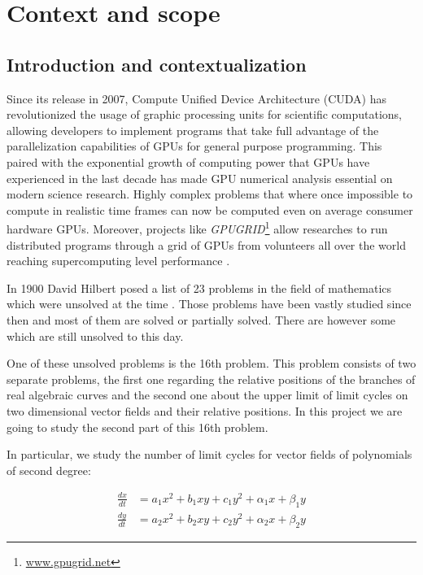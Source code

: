 
\section{Context and scope}%
\label{sec:context}

\subsection{Introduction and contextualization}%
\label{sub:intro}

Since its release in 2007, Compute Unified Device Architecture (CUDA) has
revolutionized the usage of graphic processing units for scientific
computations, allowing developers to implement programs that take full advantage
of the parallelization capabilities of GPUs for general purpose programming.
This paired with the exponential growth of computing power that GPUs have
experienced in the last decade has made GPU numerical analysis essential on
modern science research. Highly complex problems that where once impossible to
compute in realistic time frames can now be computed even on average consumer
hardware GPUs. Moreover, projects like
\emph{GPUGRID}\footnote{\url{www.gpugrid.net}} allow researches to run
distributed programs through a grid of GPUs from volunteers all over the world
reaching supercomputing level performance \cite{antaviana_nvidia_nodate}.


In 1900 David Hilbert posed a list of 23 problems in the field of mathematics
which were unsolved at the time \cite{hilbert_mathematische_1900}.  Those
problems have been vastly studied since then and most of them are solved or
partially solved. There are however some which are still unsolved to this day.

One of these unsolved problems is the 16th problem.  This problem consists of
two separate problems, the first one regarding the relative positions of the
branches of real algebraic curves and the second one about the upper limit of
limit cycles on two dimensional vector fields and their relative positions. In
this project we are going to study the second part of this 16th problem.

In particular, we study the number of limit cycles for vector fields of
polynomials of second degree:

\begin{align}
    \frac{dx}{dt} &= a_1x^2 + b_1xy + c_1y^2 + \alpha_1x + \beta_1y \\
    \frac{dy}{dt} &= a_2x^2 + b_2xy + c_2y^2 + \alpha_2x + \beta_2y
\end{align}


